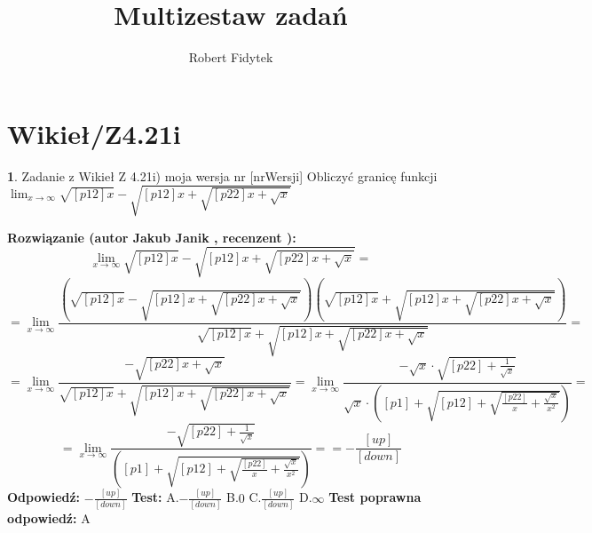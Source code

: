 \documentclass[12pt, a4paper]{article}
\title{Multizestaw zadań}
\author{Robert Fidytek}
\date{}
\theoremstyle{definition} %
\newtheorem{zad}{}
\newcommand{\kategoria}[1]{\section{#1}} %
\newcommand{\zadStart}[1]{\begin{zad}#1\newline} %
\newcommand{\zadStop}{\end{zad}}   %
\newcommand{\rozwStart}[2]{\noindent \textbf{Rozwiązanie (autor #1 , recenzent #2): }\newline} %
\newcommand{\odpStart}{\noindent \textbf{Odpowiedź:}\newline}    %
\newcommand{\odpStop}{\newline}                                             %
\newcommand{\testStart}{\noindent \textbf{Test:}\newline} %
\newcommand{\testStop}{\newline} %
\newcommand{\kluczStart}{\noindent \textbf{Test poprawna odpowiedź:}\newline} %
\newcommand{\kluczStop}{\newline} %
\begin{document}
\maketitle


\kategoria{Wikieł/Z4.21i}
\zadStart{Zadanie z Wikieł Z 4.21i) moja wersja nr [nrWersji]}
Obliczyć granicę funkcji $\lim_{x \to \infty} \sqrt{[p12]x}-\sqrt{[p12]x+\sqrt{[p22]x+\sqrt{x}}}$
\zadStop
\rozwStart{Jakub Janik}{}
$$\lim_{x \to \infty} \sqrt{[p12]x}-\sqrt{[p12]x+\sqrt{[p22]x+\sqrt{x}}}=$$
$$=\lim_{x \to \infty} \frac{(\sqrt{[p12]x}-\sqrt{[p12]x+\sqrt{[p22]x+\sqrt{x}}})(\sqrt{[p12]x}+\sqrt{[p12]x+\sqrt{[p22]x+\sqrt{x}}})}{\sqrt{[p12]x}+\sqrt{[p12]x+\sqrt{[p22]x+\sqrt{x}}}}=$$
$$=\lim_{x \to \infty} \frac{-\sqrt{[p22]x+\sqrt{x}}}{\sqrt{[p12]x}+\sqrt{[p12]x+\sqrt{[p22]x+\sqrt{x}}}}=\lim_{x \to \infty} \frac{-\sqrt{x}\cdot\sqrt{[p22]+\frac{1}{\sqrt{x}}}}{\sqrt{x}\cdot([p1]+\sqrt{[p12]+\sqrt{\frac{[p22]}{x}+\frac{\sqrt{x}}{x^2}}})}=$$
$$=\lim_{x \to \infty} \frac{-\sqrt{[p22]+\frac{1}{\sqrt{x}}}}{([p1]+\sqrt{[p12]+\sqrt{\frac{[p22]}{x}+\frac{\sqrt{x}}{x^2}}})}==-\frac{[up]}{[down]}$$
\odpStart
$-\frac{[up]}{[down]}$
\odpStop
\testStart
A.$-\frac{[up]}{[down]}$
B.$0$
C.$\frac{[up]}{[down]}$
D.$\infty$
\testStop
\kluczStart
A
\kluczStop
\end{document}
